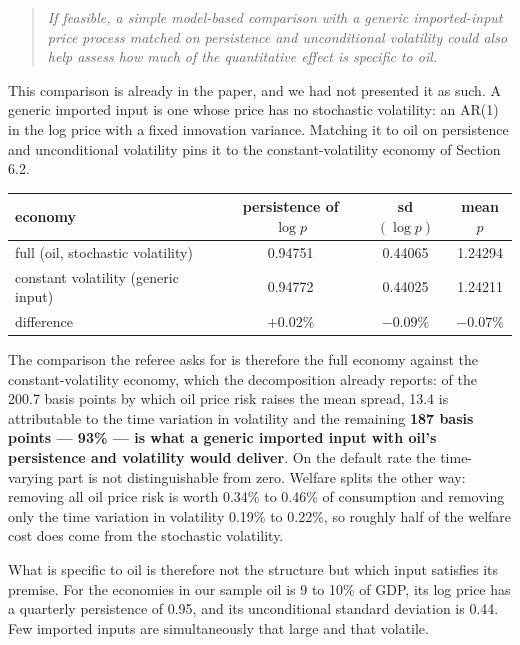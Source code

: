 \begin{quote}\itshape
If feasible, a simple model-based comparison with a generic imported-input price
process matched on persistence and unconditional volatility could also help
assess how much of the quantitative effect is specific to oil.
\end{quote}

This comparison is already in the paper, and we had not presented it as such. A
generic imported input is one whose price has no stochastic volatility: an AR(1)
in the log price with a fixed innovation variance. Matching it to oil on
persistence and unconditional volatility pins it to the constant-volatility
economy of Section 6.2.

\begin{table}[h]
\centering\footnotesize
\begin{tabular}{lccc}
\toprule
economy & persistence of $\log p$ & sd$(\log p)$ & mean $p$ \\
\midrule
full (oil, stochastic volatility)    & 0.94751 & 0.44065 & 1.24294 \\
constant volatility (generic input)  & 0.94772 & 0.44025 & 1.24211 \\
difference                           & $+0.02\%$ & $-0.09\%$ & $-0.07\%$ \\
\bottomrule
\end{tabular}
\end{table}

The comparison the referee asks for is therefore the full economy against the
constant-volatility economy, which the decomposition already reports: of the
200.7 basis points by which oil price risk raises the mean spread, 13.4 is
attributable to the time variation in volatility and the remaining
\textbf{187 basis points --- 93\% --- is what a generic imported input with
oil's persistence and volatility would deliver}. On the default rate the
time-varying part is not distinguishable from zero. Welfare splits the other way:
removing all oil price risk is worth 0.34\% to 0.46\% of consumption and removing
only the time variation in volatility 0.19\% to 0.22\%, so roughly half of the
welfare cost does come from the stochastic volatility.

What is specific to oil is therefore not the structure but which input satisfies
its premise. For the economies in our sample oil is 9 to 10\% of GDP, its log
price has a quarterly persistence of 0.95, and its unconditional standard
deviation is 0.44. Few imported inputs are simultaneously that large and that
volatile.

